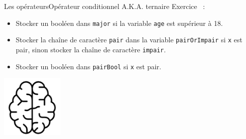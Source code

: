 \documentclass{beamer}
\begin{document}
    \begin{frame}{Les opérateurs}{Opérateur conditionnel A.K.A. ternaire}
        Exercice \execcounterdispinc{}~:
        \begin{itemize}
            \item Stocker un booléen dans \lstinline{major} si la variable \lstinline{age} est
            supérieur à 18.
            \item Stocker la chaîne de caractère
            \lstinline{pair} dans la variable \lstinline{pairOrImpair} si
            \lstinline{x} est pair, sinon stocker la chaîne de caractère \lstinline{impair}.
            \item Stocker un booléen dans \lstinline{pairBool} si \lstinline{x} est pair.
        \end{itemize}
        \bigbreak
        \centering
        \includegraphics[width=3cm]{image/intelligence}
    \end{frame}
\end{document}
